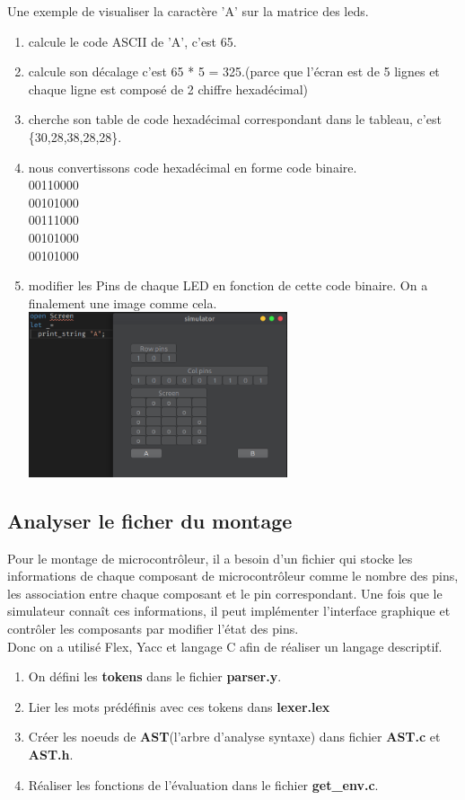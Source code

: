 \documentclass[14px]{article}
\begin{document}
Une exemple de visualiser la caractère 'A' sur la matrice des leds.
\begin{enumerate}
    \item calcule le code ASCII de 'A', c'est 65.
    \item calcule son décalage c'est 65 * 5 = 325.(parce que l'écran est de 5 lignes et chaque ligne est composé de 2 chiffre hexadécimal)
    \item cherche son table de code hexadécimal correspondant dans le tableau, c'est \{30,28,38,28,28\}.
    \item nous convertissons code hexadécimal en forme code binaire.\\
    00110000\\
    00101000\\
    00111000\\
    00101000\\
    00101000\\
    \item modifier les Pins de chaque LED en fonction de cette code binaire. On a finalement une image comme cela.\\
    \centering
    \includegraphics[width=0.6\textwidth]{printA.png}\\[1cm]

\end{enumerate}

\clearpage

\subsection{Analyser le ficher du montage}
Pour le montage de microcontrôleur, il a besoin d'un fichier qui stocke les informations de chaque composant de microcontrôleur comme le nombre des pins, les association entre chaque composant et le pin correspondant. Une fois que le simulateur connaît ces informations, il peut implémenter l'interface graphique et contrôler les composants par modifier l'état des pins.\\
Donc on a utilisé Flex, Yacc et langage C afin de réaliser un langage descriptif.
\begin{enumerate}
    \item On défini les \textbf{tokens} dans le fichier \textbf{parser.y}.
    \item Lier les mots prédéfinis avec ces tokens dans \textbf{lexer.lex}
    \item Créer les noeuds de \textbf{AST}(l'arbre d'analyse syntaxe) dans fichier \textbf{AST.c} et \textbf{AST.h}.
    \item Réaliser les fonctions de l'évaluation dans le fichier \textbf{get\_env.c}.
\end{enumerate}
\end{document}
